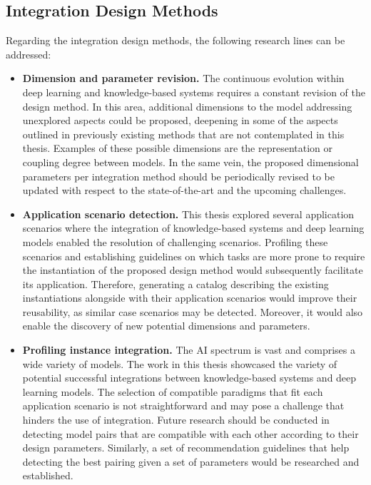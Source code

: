 \subsection*{Integration Design Methods}
Regarding the integration design methods, the following research lines can be addressed:
\begin{itemize}
    \item \textbf{Dimension and parameter revision.} The continuous evolution within deep learning and knowledge-based systems requires a constant revision of the design method. In this area, additional dimensions to the model addressing unexplored aspects could be proposed, deepening in some of the aspects outlined in previously existing methods that are not contemplated in this thesis. Examples of these possible dimensions are the representation or coupling degree between models. In the same vein, the proposed dimensional parameters per integration method should be periodically revised to be updated with respect to the state-of-the-art and the upcoming challenges. 
    
    \item \textbf{Application scenario detection.} This thesis explored several application scenarios where the integration of knowledge-based systems and deep learning models enabled the resolution of challenging scenarios. Profiling these scenarios and establishing guidelines on which tasks are more prone to require the instantiation of the proposed design method would subsequently facilitate its application. Therefore, generating a catalog describing the existing instantiations alongside with their application scenarios would improve their reusability, as similar case scenarios may be detected. Moreover, it would also enable the discovery of new potential dimensions and parameters. 
    
    \item \textbf{Profiling instance integration.} The AI spectrum is vast and comprises a wide variety of models. The work in this thesis showcased the variety of potential successful integrations between knowledge-based systems and deep learning models. The selection of compatible paradigms that fit each application scenario is not straightforward and may pose a challenge that hinders the use of integration. Future research should be conducted in detecting model pairs that are compatible with each other according to their design parameters. Similarly, a set of recommendation guidelines that help detecting the best pairing given a set of parameters would be researched and established.
\end{itemize}

